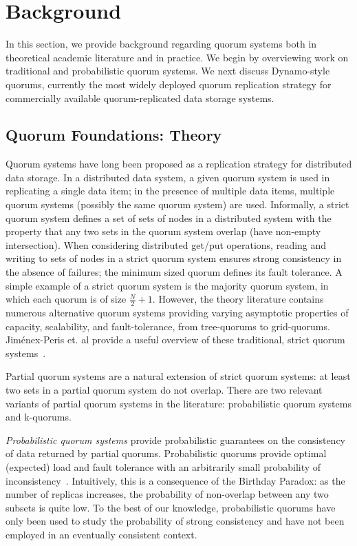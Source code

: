 \documentclass{vldb}
\begin{document}
\section{Background}
\label{sec:background}

In this section, we provide background regarding quorum systems both
in theoretical academic literature and in practice.  We begin by
overviewing work on traditional and probabilistic quorum systems.  We
next discuss Dynamo-style quorums, currently the most widely deployed
quorum replication strategy for commercially available
quorum-replicated data storage systems.

\subsection{Quorum Foundations: Theory}

Quorum systems have long been proposed as a replication strategy for
distributed data storage.  In a distributed data system, a given
quorum system is used in replicating a single data item; in the
presence of multiple data items, multiple quorum systems (possibly the
same quorum system) are used.  Informally, a strict quorum system
defines a set of sets of nodes in a distributed system with the
property that any two sets in the quorum system overlap (have
non-empty intersection). When considering distributed get/put
operations, reading and writing to sets of nodes in a strict quorum
system ensures strong consistency in the absence of failures; the
minimum sized quorum defines its fault tolerance.  A simple example of
a strict quorum system is the majority quorum system, in which each
quorum is of size $\frac{N}{2}+1$.  However, the theory literature
contains numerous alternative quorum systems providing varying
asymptotic properties of capacity, scalability, and fault-tolerance,
from tree-quorums to grid-quorums.  Jim\'{e}nex-Peris et. al provide a
useful overview of these traditional, strict quorum
systems~\cite{quorums-alternative}.

Partial quorum systems are a natural extension of strict quorum
systems: at least two sets in a partial quorum system do not
overlap.  There are two relevant variants of partial quorum systems in
the literature: probabilistic quorum systems and k-quorums.

\textit{Probabilistic quorum systems} provide probabilistic guarantees
on the consistency of data returned by partial quorums.
Probabilistic quorums provide optimal (expected) load and fault
tolerance with an arbitrarily small probability of
inconsistency~\cite{prob-quorum}.  Intuitively, this is a consequence
of the Birthday Paradox: as the number of replicas increases, the
probability of non-overlap between any two subsets is quite low.  To
the best of our knowledge, probabilistic quorums have only been used
to study the probability of strong consistency and have not been
employed in an eventually consistent context.
\end{document}
